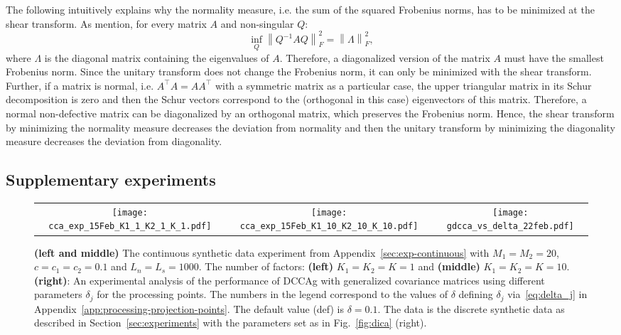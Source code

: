 \documentclass{article}
\newcommand{\norm}[1]{\left\|#1\right\|}
\begin{document}
The following intuitively explains why the normality measure, i.e. the sum of the squared Frobenius norms, has to be minimized at the shear transform. As \citep{Ruh1968} mention, for every matrix $A$ and non-singular $Q$:
$$
\inf_Q \norm{Q^{-1}AQ}_F^2 = \norm{\Lambda}_F^2,
$$
where $\Lambda$ is the diagonal matrix containing the eigenvalues of $A$. Therefore, a diagonalized version of the matrix $A$ must have the smallest Frobenius norm. Since the unitary transform does not change the Frobenius norm, it can only be minimized with the shear transform. Further, if a matrix is normal, i.e. $A^{\top}A=AA^{\top}$ with a symmetric matrix as a particular case, the upper triangular matrix in its Schur decomposition is zero  and then the Schur vectors correspond to the (orthogonal in this case) eigenvectors of this matrix. Therefore, a normal non-defective matrix can be diagonalized by an orthogonal matrix, which preserves the Frobenius norm. Hence, the shear transform by minimizing the normality measure decreases the deviation from normality and then the unitary transform by minimizing the diagonality measure decreases the deviation from diagonality.
















\subsection{Supplementary experiments}
\label{app:supplementary-experiments}

\begin{figure*}[!t]
\centering 
\begin{tabular}{ccc}
\texttt{[image: cca\_exp\_15Feb\_K1\_1\_K2\_1\_K\_1.pdf]} &
\texttt{[image: cca\_exp\_15Feb\_K1\_10\_K2\_10\_K\_10.pdf]} &
\texttt{[image: gdcca\_vs\_delta\_22feb.pdf]}
\end{tabular}
\vspace{-1em}
\caption{\textbf{(left and middle)} The continuous synthetic data experiment from Appendix~\ref{sec:exp-continuous}  with $M_1=M_2=20$, $c=c_1=c_2=0.1$ and $L_n=L_s=1000$. The number of factors: \textbf{(left)} $K_1=K_2=K=1$  and \textbf{(middle)} $K_1=K_2=K=10$. \textbf{(right)}: An experimental analysis of the performance of DCCAg with generalized covariance matrices using different parameters $\delta_j$ for the processing points. The numbers in the legend correspond to the values of $\delta$ defining $\delta_j$ via~\eqref{eq:delta_j} in Appendix~\ref{app:processing-projection-points}. The default value (def) is $\delta = 0.1$.
The data is the discrete synthetic data as described in Section~\ref{sec:experiments} with the parameters set as in Fig.~\ref{fig:dica} (right).
\vspace{-1.5em}
}
\label{fig:cca-exp}
\end{figure*}
\setlength{\textfloatsep}{11pt}
\end{document}
